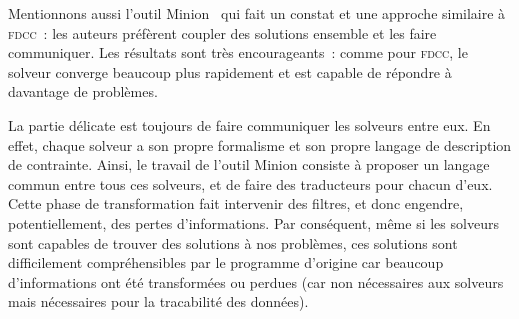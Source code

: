 Mentionnons aussi l'outil Minion~ qui fait un constat et une
approche similaire à {\scshape fdcc}~: les auteurs préfèrent coupler des
solutions ensemble et les faire communiquer. Les résultats sont très
encourageants~: comme pour {\scshape fdcc}, le solveur converge beaucoup plus
rapidement et est capable de répondre à davantage de problèmes.

La partie délicate est toujours de faire communiquer les solveurs entre eux. En
effet, chaque solveur a son propre formalisme et son propre langage de
description de contrainte. Ainsi, le travail de l'outil Minion consiste à
proposer un langage commun entre tous ces solveurs, et de faire des traducteurs
pour chacun d'eux. Cette phase de transformation fait intervenir des filtres, et
donc engendre, potentiellement, des pertes d'informations. Par conséquent, même
si les solveurs sont capables de trouver des solutions à nos problèmes, ces
solutions sont difficilement compréhensibles par le programme d'origine car
beaucoup d'informations ont été transformées ou perdues (car non nécessaires aux
solveurs mais nécessaires pour la tracabilité des données).
